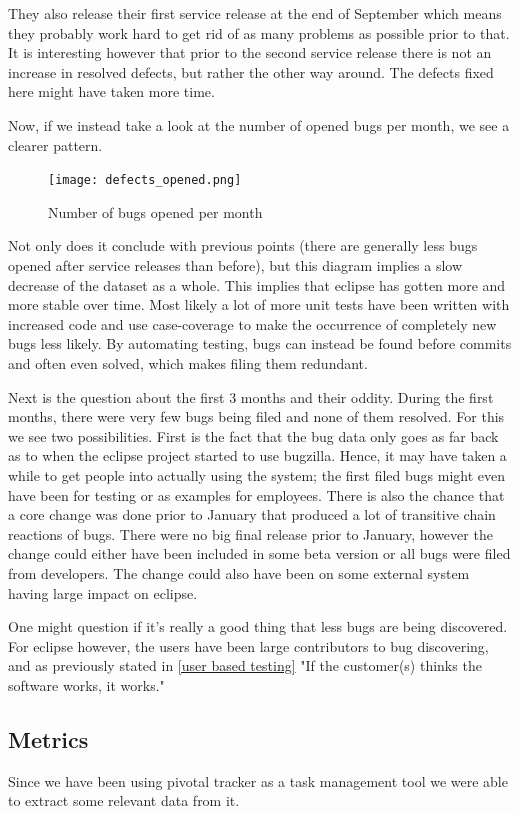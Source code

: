\documentclass{article}
\begin{document}
They also release their first service release at the end of September which means they probably work hard to get rid of as many problems as possible prior to that.
It is interesting however that prior to the second service release there is not an increase in resolved defects, but rather the other way around. 
The defects fixed here might have taken more time.

Now, if we instead take a look at the number of opened bugs per month, we see a clearer pattern.
\begin{figure}[H]
\center
\texttt{[image: defects\_opened.png]}
\caption{Number of bugs opened per month}
\end{figure}
Not only does it conclude with previous points (there are generally less bugs opened after service releases than before), but this diagram implies a slow decrease of the dataset as a whole.
This implies that eclipse has gotten more and more stable over time.
Most likely a lot of more unit tests have been written with increased code and use case-coverage to make the occurrence of completely new bugs less likely.
By automating testing, bugs can instead be found before commits and often even solved, which makes filing them redundant.

Next is the question about the first 3 months and their oddity.
During the first months, there were very few bugs being filed and none of them resolved.
For this we see two possibilities.
First is the fact that the bug data only goes as far back as to when the eclipse project started to use bugzilla.
Hence, it may have taken a while to get people into actually using the system; the first filed bugs might even have been for testing or as examples for employees.
There is also the chance that a core change was done prior to January that produced a lot of transitive chain reactions of bugs.
There were no big final release prior to January, however the change could either have been included in some beta version or all bugs were filed from developers. 
The change could also have been on some external system having large impact on eclipse.

One might question if it's really a good thing that less bugs are being discovered.
For eclipse however, the users have been large contributors to bug discovering, and as previously stated in \ref{user based testing} "If the customer(s) thinks the software works, it works."

\subsection{Metrics}
Since we have been using pivotal tracker as a task management tool we were able to extract some relevant data from it.
\end{document}
